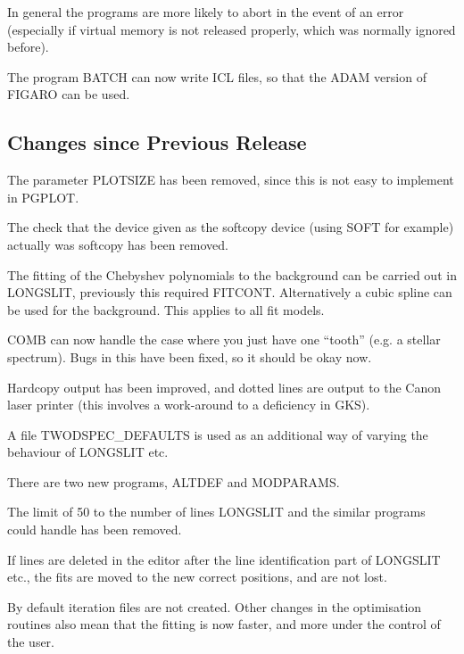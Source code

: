 \begin{list}{()}{}
\item
In general the programs are more likely to abort in the event of an
error (especially if virtual memory is not released properly, which was
normally ignored before).

\item
The program BATCH can now write ICL files, so that the ADAM version of
FIGARO can be used.

\subsection{Changes since Previous Release}

\item
The parameter PLOTSIZE has been removed, since this is not easy to
implement in PGPLOT.

\item
The check that the device given as the softcopy device (using SOFT for
example) actually was softcopy has been removed.

\item
The fitting of the Chebyshev polynomials to the background can be
carried out in LONGSLIT, previously this required FITCONT.
Alternatively a cubic spline can be used for the background. This
applies to all fit models.

\item
COMB can now handle the case where you just have one ``tooth'' (e.g. a
stellar spectrum).
Bugs in this have been fixed, so it should be okay now.

\item
Hardcopy output has been improved, and dotted lines are output to the
Canon laser printer (this involves a work-around to a deficiency in
GKS).

\item
A file TWODSPEC\_DEFAULTS is used as an additional way of varying the
behaviour of LONGSLIT etc.

\item
There are two new programs, ALTDEF and MODPARAMS.

\item
The limit of 50 to the number of lines LONGSLIT and the similar programs
could handle has been removed.

\item
If lines are deleted in the editor after the line identification part of
LONGSLIT etc., the fits are moved to the new correct positions, and are
not lost.

\item
By default iteration files are not created.
Other changes in the optimisation routines also mean that the fitting is
now faster, and more under the control of the user.


\end{list}
